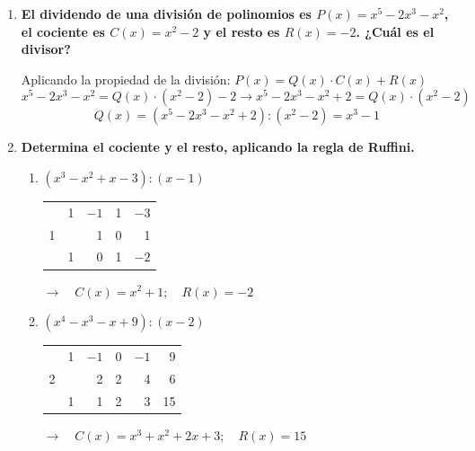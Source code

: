 \documentclass[a4paper,12pt]{article}
\begin{document}
\begin{enumerate}
\begin{enumerate}[label=\textbf{\alph*)}]
            \vspace{0.3cm}

            \item $(x^5 + 2x^3 - 1) : (x^2 - 3) \longrightarrow \begin{cases} \text{Cociente } C(x) = x^3 + 5x \\ \text{Resto } R(x) = 15x - 1 \end{cases}$
        \end{enumerate}

    \vspace{0.5cm}

    \item \textbf{El dividendo de una división de polinomios es $P(x) = x^5 - 2x^3 - x^2$, el cociente es $C(x) = x^2 - 2$ y el resto es $R(x) = -2$. ¿Cuál es el divisor?}

        \vspace{0.3cm}
        Aplicando la propiedad de la división: $P(x) = Q(x) \cdot C(x) + R(x)$
        \[
        x^5 - 2x^3 - x^2 = Q(x) \cdot (x^2 - 2) - 2 \longrightarrow x^5 - 2x^3 - x^2 + 2 = Q(x) \cdot (x^2 - 2)
        \]
        \[
        Q(x) = (x^5 - 2x^3 - x^2 + 2) : (x^2 - 2) = x^3 - 1
        \]

    \vspace{0.5cm}

    \item \textbf{Determina el cociente y el resto, aplicando la regla de Ruffini.}
        \begin{enumerate}[label=\textbf{\alph*)}]
            \item $(x^3 - x^2 + x - 3) : (x - 1)$
            \begin{center}
            \begin{tabular}{r|rrrr}
              & 1 & $-1$ & 1 & $-3$ \\
            1 &   & 1 & 0 & 1 \\ \hline
              & 1 & 0 & 1 & \multicolumn{1}{|r}{$-2$}
            \end{tabular}
            \quad $\longrightarrow \quad C(x) = x^2 + 1; \quad R(x) = -2$
            \end{center}

            \vspace{0.4cm}

            \item $(x^4 - x^3 - x + 9) : (x - 2)$
            \begin{center}
            \begin{tabular}{r|rrrrr}
              & 1 & $-1$ & 0 & $-1$ & 9 \\
            2 &   & 2 & 2 & 4 & 6 \\ \hline
              & 1 & 1 & 2 & 3 & \multicolumn{1}{|r}{15}
            \end{tabular}
            \quad $\longrightarrow \quad C(x) = x^3 + x^2 + 2x + 3; \quad R(x) = 15$
            \end{center}


\end{enumerate}
\end{enumerate}
\end{document}
